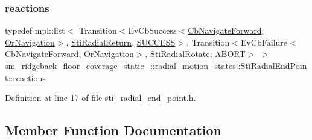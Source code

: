\subsubsection{\texorpdfstring{reactions}{reactions}}
{\footnotesize\ttfamily typedef mpl\+::list$<$ Transition$<$Ev\+Cb\+Success$<$\hyperlink{classcl__move__base__z_1_1CbNavigateForward}{Cb\+Navigate\+Forward}, \hyperlink{classsm__ridgeback__floor__coverage__static__1_1_1OrNavigation}{Or\+Navigation}$>$, \hyperlink{structsm__ridgeback__floor__coverage__static__1_1_1radial__motion__states_1_1StiRadialReturn}{Sti\+Radial\+Return}, \hyperlink{structsmacc_1_1default__transition__tags_1_1SUCCESS}{S\+U\+C\+C\+E\+SS}$>$, Transition$<$Ev\+Cb\+Failure$<$\hyperlink{classcl__move__base__z_1_1CbNavigateForward}{Cb\+Navigate\+Forward}, \hyperlink{classsm__ridgeback__floor__coverage__static__1_1_1OrNavigation}{Or\+Navigation}$>$, \hyperlink{structsm__ridgeback__floor__coverage__static__1_1_1radial__motion__states_1_1StiRadialRotate}{Sti\+Radial\+Rotate}, \hyperlink{structsmacc_1_1default__transition__tags_1_1ABORT}{A\+B\+O\+RT}$>$ $>$ \hyperlink{structsm__ridgeback__floor__coverage__static__1_1_1radial__motion__states_1_1StiRadialEndPoint_a112bf52f08cf09de3e8e62847cafe5c8}{sm\+\_\+ridgeback\+\_\+floor\+\_\+coverage\+\_\+static\+\_\+::radial\+\_\+motion\+\_\+states\+::\+Sti\+Radial\+End\+Point\+::reactions}}



Definition at line 17 of file sti\+\_\+radial\+\_\+end\+\_\+point.\+h.



\subsection{Member Function Documentation}
\mbox{\label{structsm__ridgeback__floor__coverage__static__1_1_1radial__motion__states_1_1StiRadialEndPoint_ae8683d10de2cb8d03b79feacd1da7bff}} 

